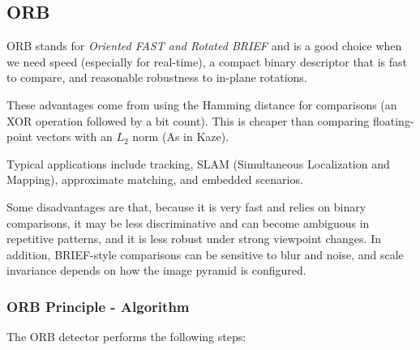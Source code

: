 \subsection{ORB}

ORB stands for \emph{Oriented FAST and Rotated BRIEF} and is a good choice when we need speed (especially for 
real-time), a compact binary descriptor that is fast to compare, and reasonable robustness to in-plane rotations.

These advantages come from using the Hamming distance for comparisons (an XOR operation followed by a bit count). 
This is cheaper than comparing floating-point vectors with an $L_2$ norm (As in Kaze).

Typical applications include tracking, SLAM (Simultaneous Localization and Mapping), approximate matching, 
and embedded scenarios.

Some disadvantages are that, because it is very fast and relies on binary comparisons, it may be less discriminative 
and can become ambiguous in repetitive patterns, and it is less robust under strong viewpoint changes. In addition, 
BRIEF-style comparisons can be sensitive to blur and noise, and scale invariance depends on how the image pyramid is 
configured.

\subsubsection{ORB Principle - Algorithm}

The ORB detector performs the following steps:

